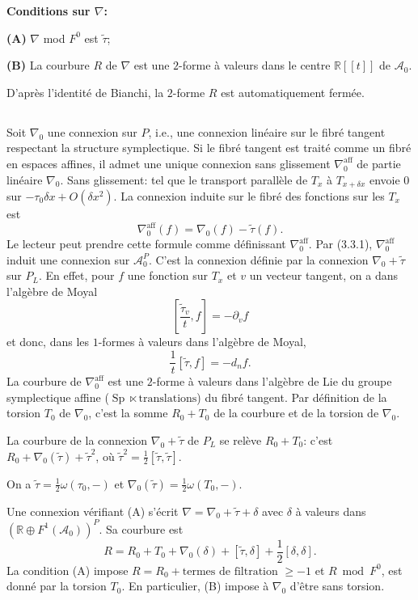 \documentclass[11pt,a4paper]{article}
\theoremstyle{plain}
\theoremstyle{definition}
\DeclareMathOperator{\Sp}{Sp}
\newcommand{\R}{\mathbb{R}}
\begin{document}
\medskip
\noindent \textbf{Conditions sur $\nabla$:}

\medskip
\noindent \textbf{(A)} $\nabla$ mod $F^{0}$ est $\tilde{\tau}$;

\noindent \textbf{(B)} La courbure $R$ de $\nabla$ est une $2$-forme \`a valeurs dans le centre $\R[[t]]$ de $\mathcal{A}_{0}$.

\medskip
D'apr\`es l'identit\'e de Bianchi, la $2$-forme $R$ est automatiquement ferm\'ee.

\subsection{}
Soit $\nabla_{0}$ une connexion sur $P$, i.e., une connexion lin\'eaire sur le fibr\'e tangent respectant la structure symplectique. Si le fibr\'e tangent est trait\'e comme un fibr\'e en espaces affines, il admet une unique connexion sans glissement $\nabla_{0}^{\text{aff}}$ de partie lin\'eaire $\nabla_{0}$. Sans glissement: tel que le transport parall\`ele de $T_{x}$ \`a $T_{x+\delta x}$ envoie $0$
sur $-\tau_{0} \delta x + O(\delta x^{2})$. La connexion induite sur le fibr\'e des fonctions sur les $T_{x}$ est
\[
\nabla_{0}^{\text{aff}}(f) = \nabla_{0}(f) - \tilde{\tau}(f).
\]
Le lecteur peut prendre cette formule comme d\'efinissant $\nabla_{0}^{\text{aff}}$. Par (3.3.1), $\nabla_{0}^{\text{aff}}$
induit une connexion sur $\mathcal{A}_{0}^{P}$. C'est la connexion d\'efinie par la connexion $\nabla_{0} + \tilde{\tau}$
sur $P_{L}$. En effet, pour $f$ une fonction sur $T_{x}$ et $v$ un vecteur tangent, on a dans
l'alg\`ebre de Moyal
\[
\left[\frac{\tilde{\tau}_{v}}{t}, f\right] = -\partial_{v} f
\]
et donc, dans les $1$-formes \`a valeurs dans l'alg\`ebre de Moyal,
\[
\frac{1}{t}[\tilde{\tau}, f] = -d_{n}f.
\]
La courbure de $\nabla_{0}^{\text{aff}}$ est une $2$-forme \`a valeurs dans l'alg\`ebre de Lie du groupe symplectique affine ($\Sp \ltimes \text{translations}$) du fibr\'e tangent. Par d\'efinition de la torsion
$T_{0}$ de $\nabla_{0}$, c'est la somme $R_{0} + T_{0}$ de la courbure et de la torsion de $\nabla_{0}$.

La courbure de la connexion $\nabla_{0} + \tilde{\tau}$ de $P_{L}$ se rel\`eve $R_{0} + T_{0}$: c'est $R_{0} + \nabla_{0}(\tilde{\tau}) + \tilde{\tau}^{2}$, o\`u $\tilde{\tau}^{2} = \frac{1}{2}[\tilde{\tau}, \tilde{\tau}]$.

On a $\tilde{\tau} = \frac{1}{2} \omega(\tau_{0}, -)$ et $\nabla_{0}(\tilde{\tau}) = \frac{1}{2} \omega(T_{0}, -)$.

Une connexion v\'erifiant (A) s'\'ecrit $\nabla = \nabla_{0} + \tilde{\tau} + \delta$
avec $\delta$ \`a valeurs dans $(\R \oplus F^{1}(\mathcal{A}_{0}))^{P}$. Sa courbure est
\[
R = R_{0} + T_{0} + \nabla_{0}(\delta) + [\tilde{\tau}, \delta] + \frac{1}{2}[\delta, \delta].
\]
La condition (A) impose $R = R_{0} + \text{termes de filtration } \geq -1$
et $R \bmod F^{0}$, est donn\'e par la torsion $T_{0}$. En particulier, (B) impose \`a $\nabla_{0}$ d'\^etre sans torsion.
\end{document}
